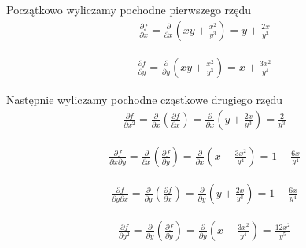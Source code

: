 \documentclass[12pt]{article}
\begin{document}
\begin{itemize}
        Początkowo wyliczamy pochodne pierwszego rzędu
        \begin{equation}
        \begin{aligned}
        \frac{\partial f}{\partial x} = \frac{\partial }{\partial x} \left( xy + \frac{x^2}{y^3}\right ) = y + \frac{2x}{y^3}
        \end{aligned}
        \end{equation}
        
        \begin{equation}
        \begin{aligned}
         \frac{\partial f}{\partial y} = \frac{\partial }{\partial y} \left( xy + \frac{x^2}{y^3}\right ) = x + \frac{3x^2}{y^4}
         \end{aligned}
        \end{equation}
        
        Następnie wyliczamy pochodne cząstkowe drugiego rzędu
        \begin{equation}
            \begin{aligned}
                \frac{\partial f }{\partial x^2} = \frac{\partial}{\partial x} \left( \frac{\partial f}{\partial x} \right ) = \frac{\partial}{ \partial x} \left( y + \frac{2x}{y^3} \right) = \frac{2}{y^3}
            \end{aligned}
        \end{equation}
        
        \begin{equation}
            \begin{aligned}
                \frac{\partial f }{\partial x \partial y} = \frac{\partial}{\partial x} \left( \frac{\partial f}{\partial y} \right) = \frac{\partial}{\partial x} \left( x - \frac{3x^2}{y^4} \right) = 1 - \frac{6x}{y^4}
            \end{aligned}
        \end{equation}
        
        \begin{equation}
            \begin{aligned}
                \frac{\partial f }{\partial y \partial x} = \frac{\partial}{\partial y} \left( \frac{\partial f}{\partial x} \right) = \frac{\partial}{\partial y} \left( y + \frac{2x}{y^3} \right) = 1 - \frac{6x}{y^4}
            \end{aligned}
        \end{equation}
        
        \begin{equation}
            \begin{aligned}
                \frac{\partial f }{\partial y^2} = \frac{\partial}{\partial y} \left( \frac{\partial f}{\partial y} \right) = \frac{\partial}{\partial y} \left( x - \frac{3x^2}{y^4} \right) = \frac{12x^2}{y^5}
            \end{aligned}
        \end{equation}
        

\end{itemize}
\end{document}
